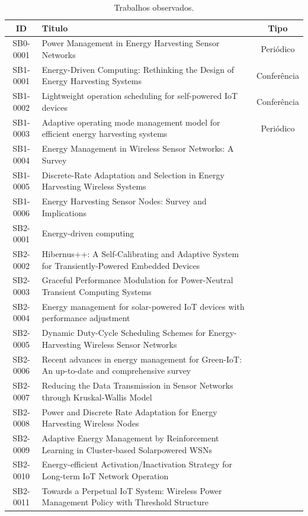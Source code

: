 \begingroup
\begin{table}[ht]
	\centering
	\caption{ Trabalhos observados.}
	\smaller[1]
	\tabcolsep=0.15cm
	\begin{tabular}{cp{11cm}c}
		\toprule
		ID &  Titulo & Tipo \\\midrule
		SB0-0001 &	Power Management in Energy Harvesting Sensor Networks & Periódico \\
		SB1-0001 &	 Energy-Driven Computing: Rethinking the Design of Energy Harvesting Systems & Conferência\\
		SB1-0002 &	 Lightweight operation scheduling for self-powered IoT devices  & Conferência \\
		SB1-0003 & Adaptive operating mode management model for efficient energy harvesting systems & Periódico\\
		SB1-0004 &	Energy Management in Wireless Sensor Networks: A Survey  &\\
		SB1-0005 &	Discrete-Rate Adaptation and Selection in Energy Harvesting Wireless Systems & \\
		SB1-0006 &	Energy Harvesting Sensor Nodes: Survey and Implications &\\
		SB2-0001 &	Energy-driven computing &\\
		SB2-0002 &	Hibernus++: A Self-Calibrating and Adaptive System for Transiently-Powered Embedded Devices &\\
		SB2-0003 &	Graceful Performance Modulation for Power-Neutral Transient Computing Systems &\\
		SB2-0004 &	Energy management for solar-powered IoT devices with performance adjustment &\\
		SB2-0005 &	Dynamic Duty-Cycle Scheduling Schemes for Energy-Harvesting Wireless Sensor Networks &\\
		SB2-0006 & Recent advances in energy management for Green-IoT: An up-to-date and comprehensive survey &\\
		SB2-0007 & Reducing the Data Transmission in Sensor Networks through Kruskal-Wallis Model &\\
		SB2-0008 & Power and Discrete Rate Adaptation for Energy Harvesting Wireless Nodes  &\\
		SB2-0009 & Adaptive Energy Management by Reinforcement Learning in Cluster-based Solarpowered WSNs& \\
		SB2-0010 & Energy-efficient Activation/Inactivation Strategy for Long-term IoT Network Operation& \\
		SB2-0011 &	 Towards a Perpetual IoT System: Wireless Power Management Policy with Threshold Structure&\\

\end{tabular}
\end{table}
